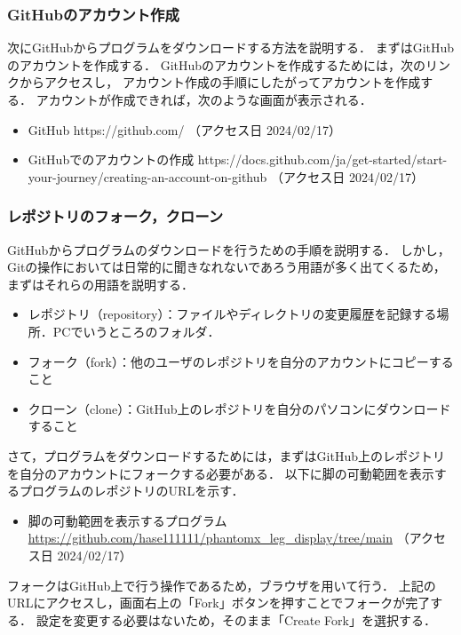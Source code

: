 \subsubsection{GitHubのアカウント作成}
次にGitHubからプログラムをダウンロードする方法を説明する．
まずはGitHubのアカウントを作成する．
GitHubのアカウントを作成するためには，次のリンクからアクセスし，
アカウント作成の手順にしたがってアカウントを作成する．
アカウントが作成できれば，次のような画面が表示される．

\begin{itemize}
  \item GitHub https://github.com/ （アクセス日 2024/02/17）
  \item GitHubでのアカウントの作成 https://docs.github.com/ja/get-started/start-your-journey/creating-an-account-on-github （アクセス日 2024/02/17）
\end{itemize}

\subsubsection{レポジトリのフォーク，クローン}
GitHubからプログラムのダウンロードを行うための手順を説明する．
しかし，Gitの操作においては日常的に聞きなれないであろう用語が多く出てくるため，
まずはそれらの用語を説明する．
\begin{itemize}
  \item レポジトリ（repository）：ファイルやディレクトリの変更履歴を記録する場所．PCでいうところのフォルダ．
  \item フォーク（fork）：他のユーザのレポジトリを自分のアカウントにコピーすること
  \item クローン（clone）：GitHub上のレポジトリを自分のパソコンにダウンロードすること
\end{itemize}

さて，プログラムをダウンロードするためには，まずはGitHub上のレポジトリを自分のアカウントにフォークする必要がある．
以下に脚の可動範囲を表示するプログラムのレポジトリのURLを示す．

\begin{itemize}
  \item 脚の可動範囲を表示するプログラム \url{https://github.com/hase111111/phantomx_leg_display/tree/main} （アクセス日 2024/02/17）
\end{itemize}

フォークはGitHub上で行う操作であるため，ブラウザを用いて行う．
上記のURLにアクセスし，画面右上の「Fork」ボタンを押すことでフォークが完了する．
設定を変更する必要はないため，そのまま「Create Fork」を選択する．

